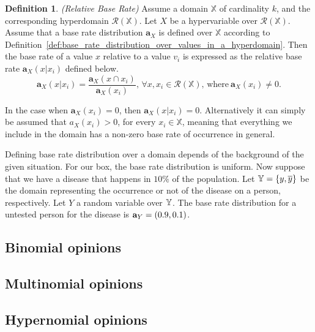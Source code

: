 \documentclass[a4paper,12pt]{article}
\theoremstyle{definition}
\newtheorem{definition}{Definition}[section]
\numberwithin{equation}{section}
\begin{document}
\begin{definition}
	\emph{(Relative Base Rate)} Assume a domain $\mathbb{X}$ of cardinality $k$, and the corresponding hyperdomain $\mathcal{R}(\mathbb{X})$. Let $X$ be a hypervariable over $\mathcal{R}(\mathbb{X})$. Assume that a base rate distribution $\mathbf{a}_X$ is defined over $\mathbb{X}$ according to Definition~\ref{def:base_rate_distribution_over_values_in_a_hyperdomain}. Then the base rate of a value $x$ relative to a value $v_i$ is expressed as the relative base rate $\mathbf{a}_X(x|x_i)$ defined below.
	\begin{equation}
		\mathbf{a}_X(x|x_i) = \dfrac{\mathbf{a}_X(x \cap x_i)}{\mathbf{a}_X(x_i)}\text{, } \forall x, x_i \in \mathcal{R}(\mathbb{X}) \text{, where}\ \mathbf{a}_X(x_i) \neq 0\text{.}
	\end{equation}

	In the case when $\mathbf{a}_X(x_i) = 0$, then $\mathbf{a}_X(x|x_i) = 0$. Alternatively it can simply be assumed that $a_X(x_i) > 0$, for every $x_i \in \mathbb{X}$, meaning that everything we include in the domain has a non-zero base rate of occurrence in general.
\end{definition}

Defining base rate distribution over a domain depends of the background of the given situation. For our box, the base rate distribution is uniform. Now suppose that we have a disease that happens in $10\%$ of the population. Let $\mathbb{Y} = \{y, \overline{y}\}$ be the domain representing the occurrence or not of the disease on a person, respectively. Let $Y$ a random variable over $\mathbb{Y}$. The base rate distribution for a untested person for the disease is $\mathbf{a}_{Y} = (0.9, 0.1)$.



\subsection{Binomial opinions}

\subsection{Multinomial opinions}

\subsection{Hypernomial opinions}
\end{document}
